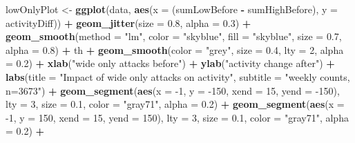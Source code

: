 \documentclass[10pt,]{scrartcl}
\newenvironment{Shaded}{\begin{snugshade}}{\end{snugshade}}
\newcommand{\KeywordTok}[1]{\textcolor[rgb]{0.13,0.29,0.53}{\textbf{#1}}}
\newcommand{\DataTypeTok}[1]{\textcolor[rgb]{0.13,0.29,0.53}{#1}}
\newcommand{\DecValTok}[1]{\textcolor[rgb]{0.00,0.00,0.81}{#1}}
\newcommand{\FloatTok}[1]{\textcolor[rgb]{0.00,0.00,0.81}{#1}}
\newcommand{\StringTok}[1]{\textcolor[rgb]{0.31,0.60,0.02}{#1}}
\newcommand{\OperatorTok}[1]{\textcolor[rgb]{0.81,0.36,0.00}{\textbf{#1}}}
\newcommand{\NormalTok}[1]{#1}
\begin{document}
\footnotesize

\begin{Shaded}
\begin{Highlighting}[]
\NormalTok{lowOnlyPlot <-}\StringTok{ }\KeywordTok{ggplot}\NormalTok{(data, }\KeywordTok{aes}\NormalTok{(}\DataTypeTok{x =}\NormalTok{ (sumLowBefore }\OperatorTok{-}\StringTok{ }\NormalTok{sumHighBefore),}
    \DataTypeTok{y =}\NormalTok{ activityDiff)) }\OperatorTok{+}\StringTok{ }\KeywordTok{geom_jitter}\NormalTok{(}\DataTypeTok{size =} \FloatTok{0.8}\NormalTok{, }\DataTypeTok{alpha =} \FloatTok{0.3}\NormalTok{) }\OperatorTok{+}
\StringTok{    }\KeywordTok{geom_smooth}\NormalTok{(}\DataTypeTok{method =} \StringTok{"lm"}\NormalTok{, }\DataTypeTok{color =} \StringTok{"skyblue"}\NormalTok{, }\DataTypeTok{fill =} \StringTok{"skyblue"}\NormalTok{,}
        \DataTypeTok{size =} \FloatTok{0.7}\NormalTok{, }\DataTypeTok{alpha =} \FloatTok{0.8}\NormalTok{) }\OperatorTok{+}\StringTok{ }\NormalTok{th }\OperatorTok{+}\StringTok{ }\KeywordTok{geom_smooth}\NormalTok{(}\DataTypeTok{color =} \StringTok{"grey"}\NormalTok{,}
    \DataTypeTok{size =} \FloatTok{0.4}\NormalTok{, }\DataTypeTok{lty =} \DecValTok{2}\NormalTok{, }\DataTypeTok{alpha =} \FloatTok{0.2}\NormalTok{) }\OperatorTok{+}\StringTok{ }\KeywordTok{xlab}\NormalTok{(}\StringTok{"wide only attacks before"}\NormalTok{) }\OperatorTok{+}
\StringTok{    }\KeywordTok{ylab}\NormalTok{(}\StringTok{"activity change after"}\NormalTok{) }\OperatorTok{+}\StringTok{ }\KeywordTok{labs}\NormalTok{(}\DataTypeTok{title =} \StringTok{"Impact of wide only attacks on activity"}\NormalTok{,}
    \DataTypeTok{subtitle =} \StringTok{"weekly counts, n=3673"}\NormalTok{) }\OperatorTok{+}\StringTok{ }\KeywordTok{geom_segment}\NormalTok{(}\KeywordTok{aes}\NormalTok{(}\DataTypeTok{x =} \DecValTok{-1}\NormalTok{,}
    \DataTypeTok{y =} \DecValTok{-150}\NormalTok{, }\DataTypeTok{xend =} \DecValTok{15}\NormalTok{, }\DataTypeTok{yend =} \DecValTok{-150}\NormalTok{), }\DataTypeTok{lty =} \DecValTok{3}\NormalTok{, }\DataTypeTok{size =} \FloatTok{0.1}\NormalTok{, }\DataTypeTok{color =} \StringTok{"gray71"}\NormalTok{,}
    \DataTypeTok{alpha =} \FloatTok{0.2}\NormalTok{) }\OperatorTok{+}\StringTok{ }\KeywordTok{geom_segment}\NormalTok{(}\KeywordTok{aes}\NormalTok{(}\DataTypeTok{x =} \DecValTok{-1}\NormalTok{, }\DataTypeTok{y =} \DecValTok{150}\NormalTok{, }\DataTypeTok{xend =} \DecValTok{15}\NormalTok{,}
    \DataTypeTok{yend =} \DecValTok{150}\NormalTok{), }\DataTypeTok{lty =} \DecValTok{3}\NormalTok{, }\DataTypeTok{size =} \FloatTok{0.1}\NormalTok{, }\DataTypeTok{color =} \StringTok{"gray71"}\NormalTok{, }\DataTypeTok{alpha =} \FloatTok{0.2}\NormalTok{) }\OperatorTok{+}

\end{Highlighting}
\end{Shaded}
\end{document}
